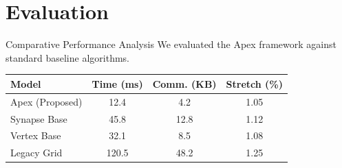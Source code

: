 \section{Evaluation}

\begin{frame}{Comparative Performance Analysis}
    We evaluated the Apex framework against standard baseline algorithms.
    
    \vspace{0.4cm}
    \centering
    \small
    \begin{tabular}{lccc}
        \toprule
        Model & Time (ms) & Comm. (KB) & Stretch (\%) \\
        \midrule
        \rowcolor{TableLight}
        Apex (Proposed) & 12.4 & 4.2 & 1.05 \\
        Synapse Base & 45.8 & 12.8 & 1.12 \\
        \rowcolor{TableLight}
        Vertex Base & 32.1 & 8.5 & 1.08 \\
        Legacy Grid & 120.5 & 48.2 & 1.25 \\
        \bottomrule
    \end{tabular}
\end{frame}

